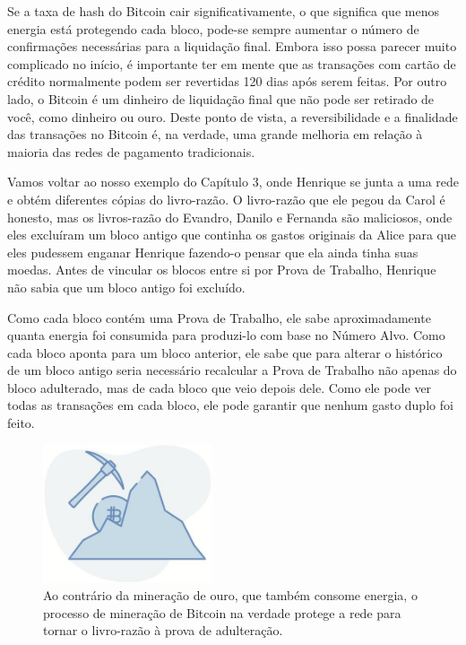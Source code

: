 Se a taxa de hash do Bitcoin cair significativamente, o que significa que menos energia está protegendo cada bloco, pode-se sempre aumentar o número de confirmações necessárias para a liquidação final. Embora isso possa parecer muito complicado no início, é importante ter em mente que as transações com cartão de crédito normalmente podem ser revertidas 120 dias após serem feitas. Por outro lado, o Bitcoin é um dinheiro de liquidação final que não pode ser retirado de você, como dinheiro ou ouro. Deste ponto de vista, a reversibilidade e a finalidade das transações no Bitcoin é, na verdade, uma grande melhoria em relação à maioria das redes de pagamento tradicionais.

Vamos voltar ao nosso exemplo do Capítulo 3, onde Henrique se junta a uma rede e obtém diferentes cópias do livro-razão. O livro-razão que ele pegou da Carol é honesto, mas os livros-razão do Evandro, Danilo e Fernanda são maliciosos, onde eles excluíram um bloco antigo que continha os gastos originais da Alice para que eles pudessem enganar Henrique fazendo-o pensar que ela ainda tinha suas moedas. Antes de vincular os blocos entre si por Prova de Trabalho, Henrique não sabia que um bloco antigo foi excluído.

Como cada bloco contém uma Prova de Trabalho, ele sabe aproximadamente quanta energia foi consumida para produzi-lo com base no Número Alvo. Como cada bloco aponta para um bloco anterior, ele sabe que para alterar o histórico de um bloco antigo seria necessário recalcular a Prova de Trabalho não apenas do bloco adulterado, mas de cada bloco que veio depois dele. Como ele pode ver todas as transações em cada bloco, ele pode garantir que nenhum gasto duplo foi feito.

\begin{figure}
  \centering
  \includegraphics[width=5cm]{imagens/capitulo-06-mineracao.jpg}
  \caption{Ao contrário da mineração de ouro, que também consome energia, o processo de mineração de Bitcoin na verdade protege a rede para tornar o livro-razão à prova de adulteração.}
\end{figure}

